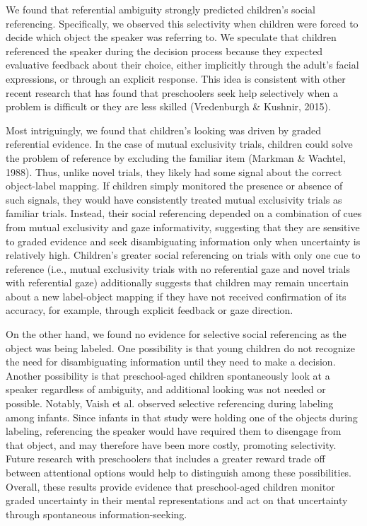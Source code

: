 \documentclass[10pt, letterpaper]{article}
\begin{document}
We found that referential ambiguity strongly predicted children's social
referencing. Specifically, we observed this selectivity when children
were forced to decide which object the speaker was referring to. We
speculate that children referenced the speaker during the decision
process because they expected evaluative feedback about their choice,
either implicitly through the adult's facial expressions, or through an
explicit response. This idea is consistent with other recent research
that has found that preschoolers seek help selectively when a problem is
difficult or they are less skilled (Vredenburgh \& Kushnir, 2015).

Most intriguingly, we found that children's looking was driven by graded
referential evidence. In the case of mutual exclusivity trials, children
could solve the problem of reference by excluding the familiar item
(Markman \& Wachtel, 1988). Thus, unlike novel trials, they likely had
some signal about the correct object-label mapping. If children simply
monitored the presence or absence of such signals, they would have
consistently treated mutual exclusivity trials as familiar trials.
Instead, their social referencing depended on a combination of cues from
mutual exclusivity and gaze informativity, suggesting that they are
sensitive to graded evidence and seek disambiguating information only
when uncertainty is relatively high. Children's greater social
referencing on trials with only one cue to reference (i.e., mutual
exclusivity trials with no referential gaze and novel trials with
referential gaze) additionally suggests that children may remain
uncertain about a new label-object mapping if they have not received
confirmation of its accuracy, for example, through explicit feedback or
gaze direction.

On the other hand, we found no evidence for selective social referencing
as the object was being labeled. One possibility is that young children
do not recognize the need for disambiguating information until they need
to make a decision. Another possibility is that preschool-aged children
spontaneously look at a speaker regardless of ambiguity, and additional
looking was not needed or possible. Notably, Vaish et al. observed
selective referencing during labeling among infants. Since infants in
that study were holding one of the objects during labeling, referencing
the speaker would have required them to disengage from that object, and
may therefore have been more costly, promoting selectivity. Future
research with preschoolers that includes a greater reward trade off
between attentional options would help to distinguish among these
possibilities. Overall, these results provide evidence that
preschool-aged children monitor graded uncertainty in their mental
representations and act on that uncertainty through spontaneous
information-seeking.
\end{document}
